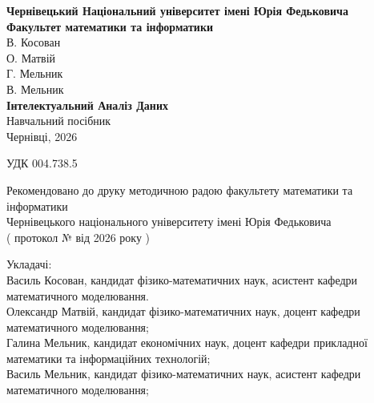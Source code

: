 \documentclass[10pt, openany]{book}
\begin{document}
\pagestyle{plain}

\begin{large}
\thispagestyle{empty}

\begin{titlepage}
\begin{center}
        {\Large \textbf{Чернівецький Національний університет імені Юрія Федьковича \\
Факультет математики та інформатики}} \\[5cm]   %

        {\Large В. Косован} \\
        {\Large О. Матвій} \\
        {\Large Г. Мельник} \\
        {\Large В. Мельник} \\[5cm]                   %

        {\Huge \textbf{Інтелектуальний Аналіз Даних}} \\[0.5cm]

        {\Large Навчальний посібник} \\[9cm]                        %

        {\large Чернівці, 2026}                              %
    \end{center}
\end{titlepage}

\newpage
\thispagestyle{empty}   %


УДК 004.738.5

\begin{center}
Рекомендовано до друку методичною радою факультету математики та інформатики \\
Чернівецького національного університету імені Юрія Федьковича \\
( протокол №  від       2026 року ) \\
\end{center}

Укладачі: \\
Василь Косован, кандидат фізико-математичних наук, асистент кафедри математичного моделювання. \\ 
Олександр Матвій, кандидат фізико-математичних наук, доцент кафедри математичного моделювання; \\
Галина Мельник, кандидат економічних наук, доцент кафедри прикладної математики та інформаційних технологій; \\
Василь Мельник, кандидат фізико-математичних наук, асистент кафедри математичного моделювання; \\



\end{large}
\end{document}
